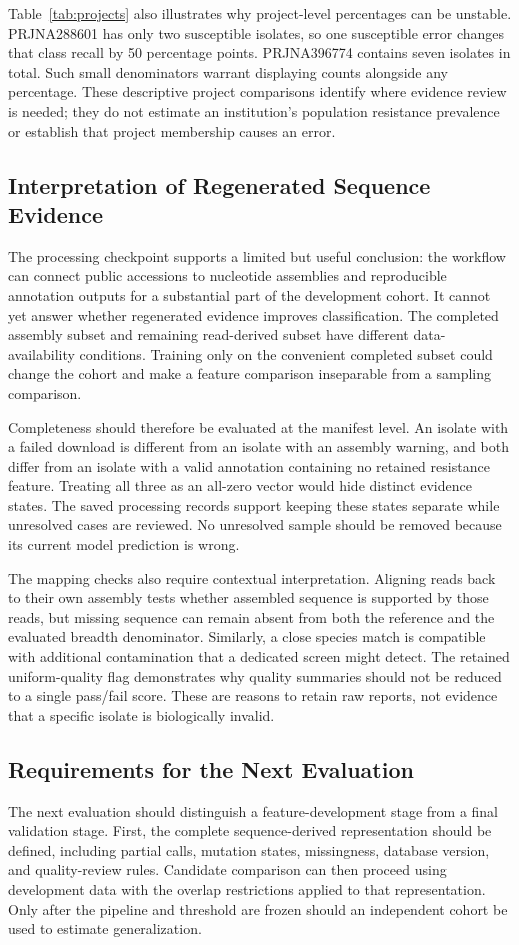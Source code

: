 \documentclass[conference]{IEEEtran}
\begin{document}
Table~\ref{tab:projects} also illustrates why project-level percentages can be unstable. PRJNA288601 has only two susceptible isolates, so one susceptible error changes that class recall by 50 percentage points. PRJNA396774 contains seven isolates in total. Such small denominators warrant displaying counts alongside any percentage. These descriptive project comparisons identify where evidence review is needed; they do not estimate an institution's population resistance prevalence or establish that project membership causes an error.

\subsection{Interpretation of Regenerated Sequence Evidence}
The processing checkpoint supports a limited but useful conclusion: the workflow can connect public accessions to nucleotide assemblies and reproducible annotation outputs for a substantial part of the development cohort. It cannot yet answer whether regenerated evidence improves classification. The completed assembly subset and remaining read-derived subset have different data-availability conditions. Training only on the convenient completed subset could change the cohort and make a feature comparison inseparable from a sampling comparison.

Completeness should therefore be evaluated at the manifest level. An isolate with a failed download is different from an isolate with an assembly warning, and both differ from an isolate with a valid annotation containing no retained resistance feature. Treating all three as an all-zero vector would hide distinct evidence states. The saved processing records support keeping these states separate while unresolved cases are reviewed. No unresolved sample should be removed because its current model prediction is wrong.

The mapping checks also require contextual interpretation. Aligning reads back to their own assembly tests whether assembled sequence is supported by those reads, but missing sequence can remain absent from both the reference and the evaluated breadth denominator. Similarly, a close species match is compatible with additional contamination that a dedicated screen might detect. The retained uniform-quality flag demonstrates why quality summaries should not be reduced to a single pass/fail score. These are reasons to retain raw reports, not evidence that a specific isolate is biologically invalid.

\subsection{Requirements for the Next Evaluation}
The next evaluation should distinguish a feature-development stage from a final validation stage. First, the complete sequence-derived representation should be defined, including partial calls, mutation states, missingness, database version, and quality-review rules. Candidate comparison can then proceed using development data with the overlap restrictions applied to that representation. Only after the pipeline and threshold are frozen should an independent cohort be used to estimate generalization.
\end{document}

